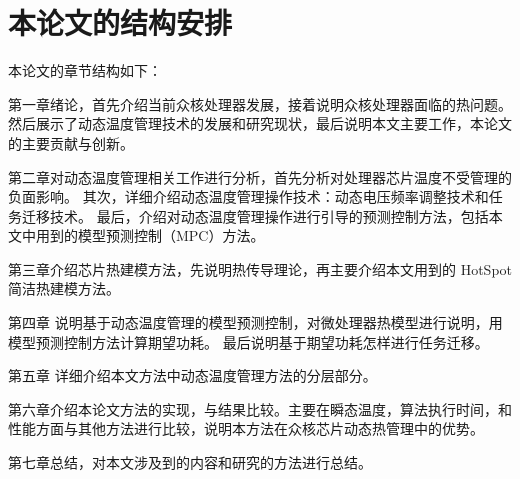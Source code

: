  \section{本论文的结构安排}\label{sec:sec}
本论文的章节结构如下：

第一章绪论，首先介绍当前众核处理器发展，接着说明众核处理器面临的热问题。
然后展示了动态温度管理技术的发展和研究现状，最后说明本文主要工作，本论文的主要贡献与创新。

第二章对动态温度管理相关工作进行分析，首先分析对处理器芯片温度不受管理的负面影响。
其次，详细介绍动态温度管理操作技术：动态电压频率调整技术和任务迁移技术。
最后，介绍对动态温度管理操作进行引导的预测控制方法，包括本文中用到的模型预测控制（MPC）方法。

第三章介绍芯片热建模方法，先说明热传导理论，再主要介绍本文用到的 HotSpot 简洁热建模方法。

第四章 说明基于动态温度管理的模型预测控制，对微处理器热模型进行说明，用模型预测控制方法计算期望功耗。
最后说明基于期望功耗怎样进行任务迁移。

第五章 详细介绍本文方法中动态温度管理方法的分层部分。

第六章介绍本论文方法的实现，与结果比较。主要在瞬态温度，算法执行时间，和性能方面与其他方法进行比较，说明本方法在众核芯片动态热管理中的优势。

第七章总结，对本文涉及到的内容和研究的方法进行总结。























